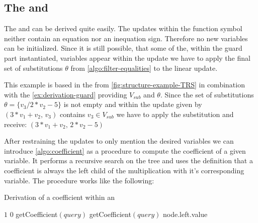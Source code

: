 \subsection{The \updatematrix and \updateconstants}
\label{sec:derivation-update}
The \updatematrix and \updateconstants can be derived quite easily. The updates within the function symbol neither contain an equation nor an inequation sign. Therefore no new variables can be initialized. Since it is still possible, that some of the, within the guard part instantiated, variables appear within the update we have to apply the final set of substitutions $\theta$ from \autoref{algo:filter-equalities} to the linear update. 

\begin{example}
	\label{ex:derivation-update-sub}
	This example is based in the \its  from \autoref{fig:structure-example-TRS} in combination with the \autoref{ex:derivation-guard} providing $V_{sub}$ and $\theta$. \newline
	Since the set of substitutions $\theta=\{v_3/2*v_2-5\}$ is not empty and within the update given by\newline
	\hspace*{1cm}$(3*v_1+v_2\text{, } v_3)$\newline
	contains $v_3 \in V_{sub}$ we have to apply the substitution and receive:\newline
	\hspace*{1cm}$(3*v_1+v_2\text{, }2*v_2-5)$
\end{example}

After restraining the updates to only mention the desired variables we can introduce \autoref{algo:coefficient} as a procedure to compute the coefficient of a given variable. It performs a recursive search on the tree and uses the \stdLinInt definition that a coefficient is always the left child of the multiplication with it's corresponding variable. The procedure works like the following:
\begin{algorithm}[H]
	\caption{Derivation of a coefficient within an \rpntree}
	\label{algo:coefficient}
	\begin{algorithmic}[1]
				\State \Return $1$
			 
				\State \Return $0$
			\EndIf
			\State
			 
					\State \Return getCoefficient$(query)$
				\Else
					\State \Return getCoefficient$(query)$
				\EndIf
			\EndIf
			 
					\State \Return node.left.value
				\EndIf				
			\EndIf
		\EndFunction
	\end{algorithmic}
\end{algorithm}

